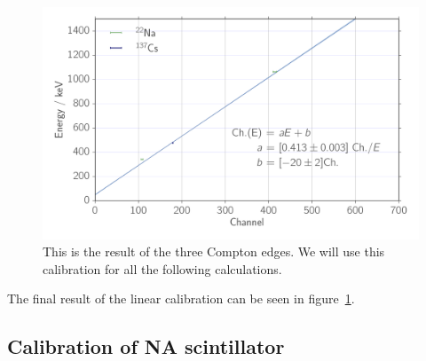 \begin{figure}[htpb]
    \centering
    \includegraphics[width=0.9\linewidth]{./analysis/figures/calibration_ps_linear_fit}
    \caption{This is the result of the three Compton edges. We will use this calibration
    for all the following calculations.}
\label{fig:calibration_ps_linear_fit}
\end{figure}
The final result of the linear calibration can be seen in
figure~\ref{fig:calibration_ps_linear_fit}.

\subsection{Calibration of NA scintillator}
\label{sub:calibration_of_na_scintillator}


